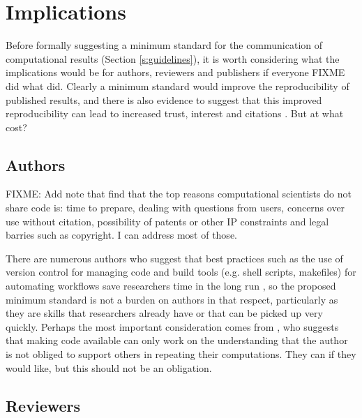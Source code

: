 \section{Implications}

Before formally suggesting a minimum standard for the communication of computational results (Section \ref{s:guidelines}), it is worth considering what the implications would be for authors, reviewers and publishers if everyone FIXME did what \citet{Irving2015} did. Clearly a minimum standard would improve the reproducibility of published results, and there is also evidence to suggest that this improved reproducibility can lead to increased trust, interest and citations \citep{Piwowar2007}. But at what cost?

\subsection{Authors}

FIXME: Add note that \citet{Stodden2010} find that the top reasons computational scientists do not share code is: time to prepare, dealing with questions from users, concerns over use without citation, possibility of patents or other IP constraints and legal barries such as copyright. I can address most of those.

There are numerous authors who suggest that best practices such as the use of version control for managing code and build tools (e.g. shell scripts, makefiles) for automating workflows save researchers time in the long run \citep[e.g.][]{Sandve2013,Wilson2014a}, so the proposed minimum standard is not a burden on authors in that respect, particularly as they are skills that researchers already have or that can be picked up very quickly. Perhaps the most important consideration comes from \citet{Easterbrook2014}, who suggests that making code available can only work on the understanding that the author is not obliged to support others in repeating their computations. They can if they would like, but this should not be an obligation.

\subsection{Reviewers}

